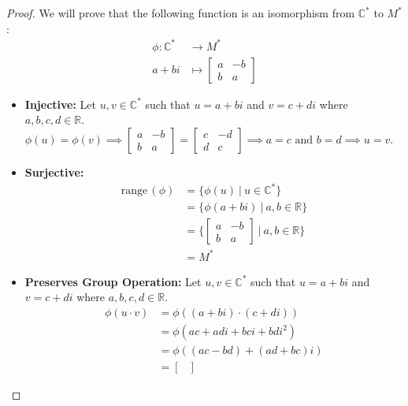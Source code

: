 \documentclass[12pt,reqno]{article}
\newcommand{\range}{\mathrm{range\,}}
\newcommand{\R}{\mathbb{R}}
\newcommand{\C}{\mathbb{C}}
\theoremstyle{plain}
\theoremstyle{definition}
\begin{document}
\begin{proof}
    We will prove that the following function is an isomorphism from \(\C^*\) to \(M^*\):
    \begin{align*}
        \phi:\C^*&\to M^*\\
        a+bi&\mapsto \begin{bmatrix}
            a & -b\\
            b & a
        \end{bmatrix}
    \end{align*} 
    \begin{itemize}
        \item \textbf{Injective: } Let \(u,v\in\C^*\) such that \(u=a+bi\) and \(v=c+di\) where \(a,b,c,d\in\R\).
        \(\phi(u)=\phi(v)\implies
            \begin{bmatrix}
                a & -b\\
                b & a
            \end{bmatrix}
            =
            \begin{bmatrix}
                c & -d\\
                d & c
            \end{bmatrix}
        \implies a=c\text{ and }b=d\implies u=v\).
        \item \textbf{Surjective: }
        \begin{align*}
            \range(\phi) &= \{\phi(u)\ |\ u\in\C^*\}\\
            &= \{\phi(a+bi)\ |\ a,b\in\R\}\\
            &= 
            \biggl\{
                \begin{bmatrix}
                    a & -b\\
                    b & a
                \end{bmatrix}
                \ \bigg|\ a,b\in\R
            \biggr\}\\
            &= M^*
        \end{align*}
    \item \textbf{Preserves Group Operation: } Let \(u,v\in\C^*\) such that \(u=a+bi\) and \(v=c+di\) where \(a,b,c,d\in\R\).
    \begin{align*}
        \phi(u\cdot v) &= \phi((a+bi)\cdot (c+di))\\
        &= \phi(ac+adi+bci+bdi^2)\\
        &= \phi((ac-bd)+(ad+bc)i)\\
        &= \begin{bmatrix}

\end{bmatrix}
\end{align*}
\end{itemize}
\end{proof}
\end{document}
